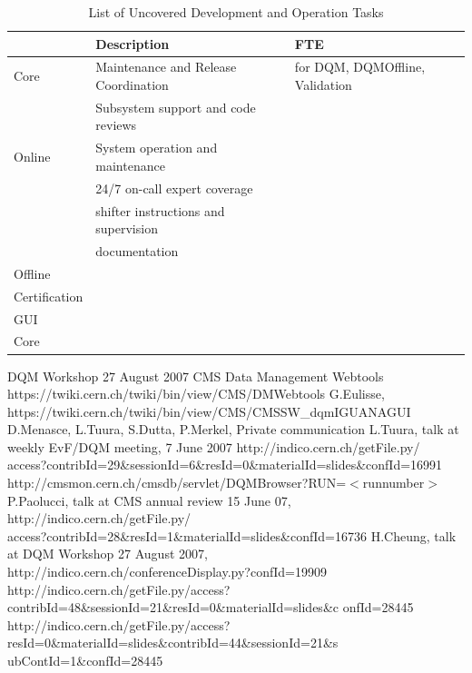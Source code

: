 \documentclass[a4paper]{cmspaper}
\begin{document}
\begin{table}[h]
\begin{center}
\begin{tabular}{||l|l|l||}
\hline \hline
       & Description & FTE \\
       \hline 
Core   &  Maintenance and Release Coordination  &
          for DQM, DQMOffline, Validation \\
       &  Subsystem support and code reviews \\
Online &  System operation and maintenance & \\
       &  24/7 on-call expert coverage & \\
       &  shifter instructions and supervision & \\
       &  documentation & \\
Offline &  & \\
Certification &  & \\
GUI &  & \\
Core &  & \\
\hline \hline
\end{tabular}
\end{center}
\label{tab:summary:operation}
\caption{List of Uncovered Development and Operation Tasks}
\end{table}


\begin{thebibliography}{99}

 DQM Workshop 27 August 2007
 CMS Data Management Webtools https://twiki.cern.ch/twiki/bin/view/CMS/DMWebtools
 G.Eulisse, https://twiki.cern.ch/twiki/bin/view/CMS/CMSSW\_dqmIGUANAGUI
 D.Menasce, L.Tuura, S.Dutta, P.Merkel, Private
communication
 L.Tuura, talk at weekly EvF/DQM meeting, 7 June 2007
http://indico.cern.ch/getFile.py/\\
access?contribId=29\&sessionId=6\&resId=0\&materialId=slides\&confId=16991
 http://cmsmon.cern.ch/cmsdb/servlet/DQMBrowser?RUN=$<$runnumber$>$
 P.Paolucci,
talk at CMS annual review 15 June 07,
http://indico.cern.ch/getFile.py/\\
access?contribId=28\&resId=1\&materialId=slides\&confId=16736
 H.Cheung, 
talk at DQM Workshop 27 August 2007, \\
http://indico.cern.ch/conferenceDisplay.py?confId=19909
   http://indico.cern.ch/getFile.py/access?contribId=48\&sessionId=21\&resId=0\&materialId=slides\&c
onfId=28445   
   http://indico.cern.ch/getFile.py/access?resId=0\&materialId=slides\&contribId=44\&sessionId=21\&s
ubContId=1\&confId=28445

\end{thebibliography}
\end{document}
